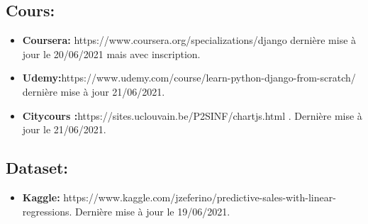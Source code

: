 \documentclass[a4paper]{report}
\begin{document}
\begin{doublespace}
\begin{doublespace}
\begin{doublespace}
\begin{doublespace}
\begin{doublespace}
\begin{doublespace}
\subsection{Cours:}
\begin{itemize}
 \item \textbf{Coursera:} https://www.coursera.org/specializations/django dernière mise à jour le 20/06/2021 mais avec inscription.
 \item\textbf{Udemy:}https://www.udemy.com/course/learn-python-django-from-scratch/ dernière mise à jour 21/06/2021.
 \item \textbf{Citycours :}https://sites.uclouvain.be/P2SINF/chartjs.html . Dernière mise à jour le 21/06/2021. 
\end{itemize}
\subsection{Dataset:}
 \begin{itemize}
     \item \textbf{Kaggle:} https://www.kaggle.com/jzeferino/predictive-sales-with-linear-regressions. Dernière mise à jour le 19/06/2021.
 \end{itemize}
\end{doublespace}
\end{doublespace}
\end{doublespace}
\end{doublespace}
\end{doublespace}
\end{doublespace}
\end{document}
